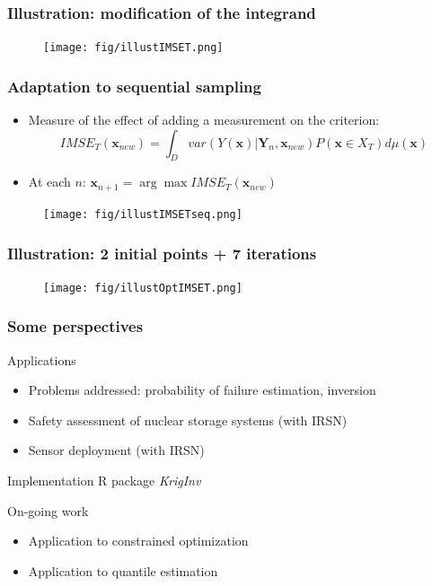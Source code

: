 \documentclass[10pt]{beamer}
\begin{document}
\frame
{
\frametitle{Illustration: modification of the integrand}
\begin{figure}
	\centering
		\texttt{[image: fig/illustIMSET.png]}
\end{figure}	
}

\frame
{
\frametitle{Adaptation to sequential sampling}
\begin{itemize}
 \item Measure of the effect of adding a measurement on the criterion:
$$IMSE_T(\mathbf{x}_{new}) = \int_D var(Y(\mathbf{x}) | \mathbf{Y}_n, \mathbf{x}_{new}) P\left(\mathbf{x} \in X_T \right)d\mu(\mathbf{x})$$
 \item At each $n$: $\mathbf{x}_{n+1} = \arg \max IMSE_T(\mathbf{x}_{new})$
\end{itemize}

\begin{figure}
	\centering
		\texttt{[image: fig/illustIMSETseq.png]}
\end{figure}	
}


\frame
{
\frametitle{Illustration: 2 initial points + 7 iterations}
\begin{figure}
	\centering
		\texttt{[image: fig/illustOptIMSET.png]}
\end{figure}	
}

\frame
{
\frametitle{Some perspectives}
\begin{block}{Applications}
\begin{itemize}
	\item Problems addressed: probability of failure estimation, inversion
	\item Safety assessment of nuclear storage systems (with IRSN)
	\item Sensor deployment (with IRSN)
\end{itemize}
\end{block}

\begin{block}{Implementation}
R package \textit{KrigInv}
\end{block}

\begin{block}{On-going work}
\begin{itemize}
	\item Application to constrained optimization
	\item Application to quantile estimation
\end{itemize}
\end{block}
}
\end{document}
